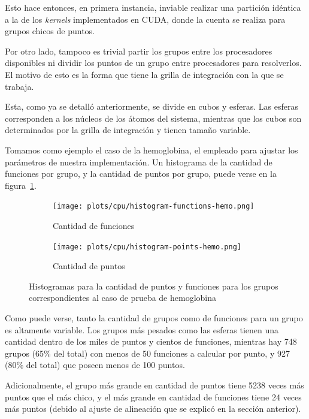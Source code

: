 Esto hace entonces, en primera instancia, inviable realizar una partici\'on id\'entica a
la de los \textit{kernels} implementados en CUDA, donde la cuenta se realiza para
grupos chicos de puntos.

Por otro lado, tampoco es trivial partir los grupos entre los procesadores disponibles
ni dividir los puntos de un grupo entre procesadores para resolverlos.
El motivo de esto es la forma que tiene la grilla de integraci\'on con la que se trabaja.

Esta, como ya se detall\'o anteriormente, se divide en cubos y
esferas. Las esferas corresponden a los n\'ucleos de los \'atomos del sistema,
mientras que los cubos son determinados por la grilla de integraci\'on y tienen tama\~no
variable.

Tomamos como ejemplo el caso de la hemoglobina, el empleado para ajustar los
par\'ametros de nuestra implementaci\'on. Un histograma de la cantidad de
funciones por grupo, y la cantidad de puntos por grupo, puede verse en la
figura~\ref{fig:lio-histo-groups}.

\begin{figure}[htbp]
   \centering
   \begin{subfigure}[b]{\plotwidthtres}
     \texttt{[image: plots/cpu/histogram-functions-hemo.png]}
     \caption{Cantidad de funciones}
   \end{subfigure}
   \begin{subfigure}[b]{\plotwidthtres}
     \texttt{[image: plots/cpu/histogram-points-hemo.png]}
     \caption{Cantidad de puntos}
   \end{subfigure}
   \caption{Histogramas para la cantidad de puntos y funciones para los grupos correspondientes al caso de prueba
   de hemoglobina}
   \label{fig:lio-histo-groups}
\end{figure}

Como puede verse, tanto la cantidad de grupos como de funciones para un grupo es altamente
variable. Los grupos m\'as pesados como las esferas tienen una cantidad dentro de los
miles de puntos y cientos de funciones, mientras hay 748 grupos (65\%
del total) con menos de 50 funciones a calcular por punto, y 927 (80\% del total)
que poseen menos de 100 puntos.

Adicionalmente, el grupo m\'as grande en cantidad de puntos tiene 5238 veces m\'as
puntos que el m\'as chico, y el m\'as grande en cantidad de funciones tiene 24
veces m\'as puntos (debido al ajuste de alineaci\'on que se explic\'o en la
secci\'on anterior).


